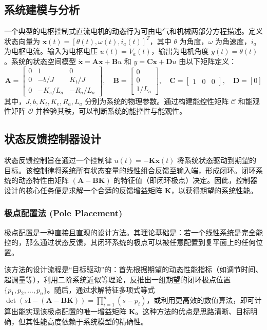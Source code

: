\documentclass[12pt, a4paper]{article}
\begin{document}
\subsection{系统建模与分析}
一个典型的电枢控制式直流电机的动态行为可由电气和机械两部分方程描述。定义状态向量为 $\bm{x}(t) = [\theta(t), \omega(t), i_a(t)]^T$，其中 $\theta$ 为角度，$\omega$ 为角速度，$i_a$ 为电枢电流。输入为电枢电压 $u(t)=V_a(t)$，输出为电机角度 $y(t)=\theta(t)$。系统的状态空间模型 $\dot{\bm{x}} = \bm{A}\bm{x} + \bm{B}u$ 和 $y = \bm{C}\bm{x} + \bm{D}u$ 由以下矩阵定义：
\begin{equation}
    \bm{A} = 
    \begin{bmatrix}
        0 & 1 & 0 \\
        0 & -b/J & K_t/J \\
        0 & -K_e/L_a & -R_a/L_a
    \end{bmatrix},
    \quad
    \bm{B} = 
    \begin{bmatrix}
        0 \\ 0 \\ 1/L_a
    \end{bmatrix},
    \quad
    \bm{C} = 
    \begin{bmatrix}
        1 & 0 & 0
    \end{bmatrix},
    \quad
    \bm{D} = [0]
    \label{eq:ss_model}
\end{equation}
其中，$J, b, K_t, K_e, R_a, L_a$ 分别为系统的物理参数。通过构建能控性矩阵 $\mathcal{C}$ 和能观性矩阵 $\mathcal{O}$ 并检验其秩，可以判断系统的能控性与能观性。

\subsection{状态反馈控制器设计}
状态反馈控制旨在通过一个控制律 $u(t) = - \bm{K}\bm{x}(t)$ 将系统状态驱动到期望的目标。该控制律将系统所有状态变量的线性组合反馈至输入端，形成闭环。闭环系统的动态特性由矩阵 $(\bm{A} - \bm{B}\bm{K})$ 的特征值（即闭环极点）决定。因此，控制器设计的核心任务便是求解一个合适的反馈增益矩阵 $\bm{K}$，以获得期望的系统性能。

\subsubsection{极点配置法 (Pole Placement)}
极点配置是一种直接且直观的设计方法。其理论基础是：若一个线性系统是完全能控的，那么通过状态反馈，其闭环系统的极点可以被任意配置到复平面上的任何位置。

该方法的设计流程是“目标驱动”的：首先根据期望的动态性能指标（如调节时间、超调量等），利用二阶系统近似等理论，反推出一组期望的闭环极点位置 $\{p_1, p_2, \dots, p_n\}$。随后，通过求解特征多项式等式 $\det(s\bm{I} - (\bm{A} - \bm{B}\bm{K})) = \prod_{i=1}^{n}(s-p_i)$，或利用更高效的数值算法，即可计算出能实现该极点配置的唯一增益矩阵 $\bm{K}$。这种方法的优点是思路清晰、目标明确，但其性能高度依赖于系统模型的精确性。
\end{document}
